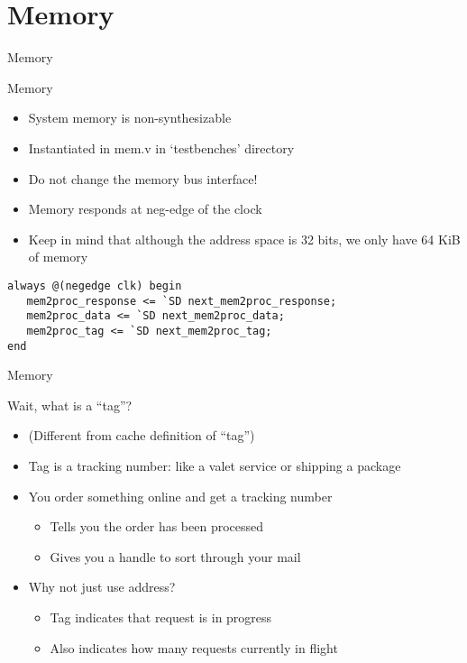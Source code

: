 \documentclass[table,dvipsnames]{beamer}
\begin{document}
\section{Memory}
\begin{frame}[fragile]{Memory}
	\begin{block}{Memory}
		\begin{itemize}

			\item System memory is non-synthesizable
			\item Instantiated in mem.v in `testbenches' directory
			\item Do not change the memory bus interface!
			\item Memory responds at neg-edge of the clock
			\item Keep in mind that although the address space is 32 bits, we only have 64 KiB of memory
		\end{itemize}
		\begin{verbatim}
always @(negedge clk) begin
   mem2proc_response <= `SD next_mem2proc_response; 
   mem2proc_data <= `SD next_mem2proc_data; 
   mem2proc_tag <= `SD next_mem2proc_tag;
end
		\end{verbatim}
	\end{block}
\end{frame}

\begin{frame}[fragile]{Memory}
	\begin{block}{Wait, what is a ``tag''?}
		\begin{itemize}
			\item (Different from cache definition of ``tag'')
			\item Tag is a tracking number: like a valet service or shipping a package
			\item You order something online and get a tracking number
			\begin{itemize} \item Tells you the order has been processed
			\item Gives you a handle to sort through your mail \end{itemize}
			\item Why not just use address? 
			\begin{itemize} 
				\item Tag indicates that request is in progress
				\item Also indicates how many requests currently in flight 
			\end{itemize}
		\end{itemize}
	\end{block}
\end{frame}
\end{document}
